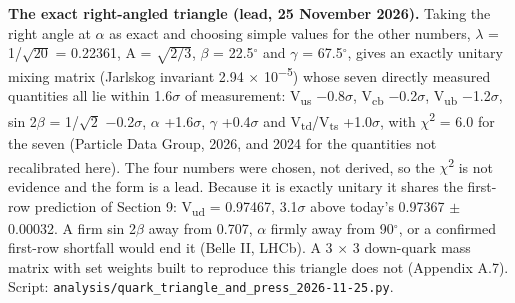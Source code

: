 \documentclass[
  11pt,
]{article}
\begin{document}
\textbf{The exact right-angled triangle (lead, 25 November 2026).} Taking the right angle at \ensuremath{\alpha} as exact and choosing simple values for the other numbers, \ensuremath{\lambda} = 1/\ensuremath{\sqrt{20}} = 0.22361, A = \ensuremath{\sqrt{2/3}}, \ensuremath{\beta} = 22.5\ensuremath{^\circ} and \ensuremath{\gamma} = 67.5\ensuremath{^\circ}, gives an exactly unitary mixing matrix (Jarlskog invariant 2.94 \ensuremath{\times} 10\textsuperscript{\ensuremath{-}5}) whose seven directly measured quantities all lie within 1.6\ensuremath{\sigma} of measurement: \textbar V\textsubscript{us}\textbar{} \ensuremath{-}0.8\ensuremath{\sigma}, \textbar V\textsubscript{cb}\textbar{} \ensuremath{-}0.2\ensuremath{\sigma}, \textbar V\textsubscript{ub}\textbar{} \ensuremath{-}1.2\ensuremath{\sigma}, sin 2\ensuremath{\beta} = 1/\ensuremath{\sqrt{2}} \ensuremath{-}0.2\ensuremath{\sigma}, \ensuremath{\alpha} +1.6\ensuremath{\sigma}, \ensuremath{\gamma} +0.4\ensuremath{\sigma} and \textbar V\textsubscript{td}/V\textsubscript{ts}\textbar{} +1.0\ensuremath{\sigma}, with \ensuremath{\chi}\textsuperscript{2} = 6.0 for the seven (Particle Data Group, 2026, and 2024 for the quantities not recalibrated here). The four numbers were chosen, not derived, so the \ensuremath{\chi}\textsuperscript{2} is not evidence and the form is a lead. Because it is exactly unitary it shares the first-row prediction of Section 9: \textbar V\textsubscript{ud}\textbar{} = 0.97467, 3.1\ensuremath{\sigma} above today's 0.97367 \ensuremath{\pm} 0.00032. A firm sin 2\ensuremath{\beta} away from 0.707, \ensuremath{\alpha} firmly away from 90\ensuremath{^\circ}, or a confirmed first-row shortfall would end it (Belle II, LHCb). A 3 \ensuremath{\times} 3 down-quark mass matrix with set weights built to reproduce this triangle does not (Appendix A.7). Script: \texttt{analysis/quark\_triangle\_and\_press\_2026-11-25.py}.
\end{document}
